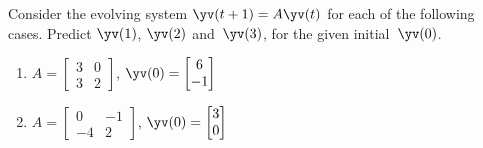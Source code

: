 \begin{exercise} \label{ex:yay} 
Consider the evolving system \(\yv(t+1)=A\yv(t)\) for each of the following cases. 
Predict \(\yv(1)\), \(\yv(2)\) and~\(\yv(3)\), for the given initial~\(\yv(0)\).
\begin{enumerate}
\item \(A=\begin{bmatrix} 3 & 0
\\3 & 2 \end{bmatrix}\), 
\(\yv(0)=\begin{bmatrix} 6
\\-1 \end{bmatrix}\)

\item \(A=\begin{bmatrix} 0 & -1
\\-4 & 2 \end{bmatrix}\), 
\(\yv(0)=\begin{bmatrix} 3
\\0 \end{bmatrix}\)



\end{enumerate}
\end{exercise}
